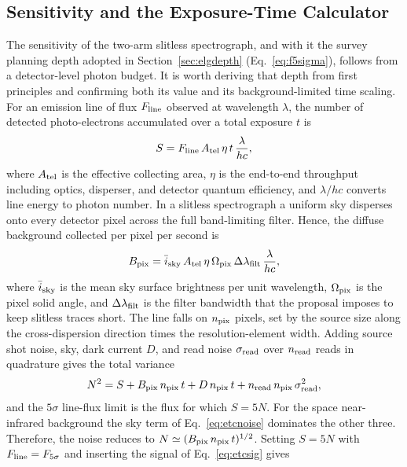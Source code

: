 \documentclass[10pt,onecolumn]{article}
\begin{document}
\subsection{Sensitivity and the Exposure-Time Calculator}\label{sec:etc}

The sensitivity of the two-arm slitless spectrograph, and with it the survey planning depth adopted in Section~\ref{sec:elgdepth} (Eq.~\eqref{eq:f5sigma}), follows from a detector-level photon budget. It is worth deriving that depth from first principles and confirming both its value and its background-limited time scaling. For an emission line of flux $F_{\rm line}$ observed at wavelength $\lambda$, the number of detected photo-electrons accumulated over a total exposure $t$ is
\begin{equation}
  S=F_{\rm line}\,A_{\rm tel}\,\eta\,t\,\frac{\lambda}{hc},
  \label{eq:etcsig}
\end{equation}
where $A_{\rm tel}$ is the effective collecting area, $\eta$ is the end-to-end throughput including optics, disperser, and detector quantum efficiency, and $\lambda/hc$ converts line energy to photon number. In a slitless spectrograph a uniform sky disperses onto every detector pixel across the full band-limiting filter. Hence, the diffuse background collected per pixel per second is
\begin{equation}
  B_{\rm pix}=\bar i_{\rm sky}\,A_{\rm tel}\,\eta\,\Omega_{\rm pix}\,\Delta\lambda_{\rm filt}\,\frac{\lambda}{hc},
  \label{eq:etcbg}
\end{equation}
where $\bar i_{\rm sky}$ is the mean sky surface brightness per unit wavelength, $\Omega_{\rm pix}$ is the pixel solid angle, and $\Delta\lambda_{\rm filt}$ is the filter bandwidth that the proposal imposes to keep slitless traces short. The line falls on $n_{\rm pix}$ pixels, set by the source size along the cross-dispersion direction times the resolution-element width. Adding source shot noise, sky, dark current $D$, and read noise $\sigma_{\rm read}$ over $n_{\rm read}$ reads in quadrature gives the total variance
\begin{equation}
  N^2=S+B_{\rm pix}\,n_{\rm pix}\,t+D\,n_{\rm pix}\,t+n_{\rm read}\,n_{\rm pix}\,\sigma_{\rm read}^2,
  \label{eq:etcnoise}
\end{equation}
and the $5\sigma$ line-flux limit is the flux for which $S=5N$. For the space near-infrared background the sky term of Eq.~\eqref{eq:etcnoise} dominates the other three. Therefore, the noise reduces to $N\simeq(B_{\rm pix}\,n_{\rm pix}\,t)^{1/2}$. Setting $S=5N$ with $F_{\rm line}=F_{5\sigma}$ and inserting the signal of Eq.~\eqref{eq:etcsig} gives
\end{document}
